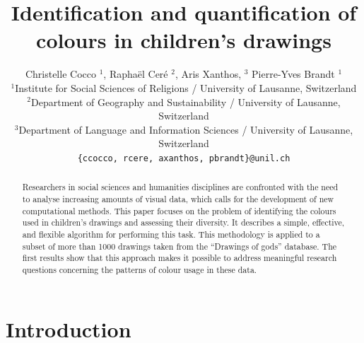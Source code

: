 \documentclass[11pt,a4paper]{article}
\title{Identification and quantification of colours in children's drawings}
\author{Christelle Cocco ${}^1$, Rapha\"el Cer\'e ${}^2$, Aris Xanthos, ${}^3$  Pierre-Yves Brandt ${}^1$\\
  ${}^1$Institute for Social Sciences of Religions / University of Lausanne, Switzerland \\
  ${}^2$Department of Geography and Sustainability / University of Lausanne, Switzerland \\
  ${}^3$Department of Language and Information Sciences / University of Lausanne, Switzerland \\
  {\tt \{ccocco, rcere, axanthos, pbrandt\}@unil.ch} \\
  }
\date{}
\begin{document}
\maketitle
\begin{abstract}
Researchers in social sciences and humanities disciplines are confronted with the need to analyse increasing amounts of visual data, which calls for the development of new computational methods. This paper focuses on the problem of identifying the colours used in children's drawings and assessing their diversity. It describes a simple, effective, and flexible algorithm for performing this task. This methodology is applied to a subset of more than 1000 drawings taken from the ``Drawings of gods'' database. The first results show that this approach makes it possible to address meaningful research questions concerning the patterns of colour usage in these data. 
\end{abstract}


\section{Introduction}\label{introduction}
\label{sec:introduction}
\end{document}

